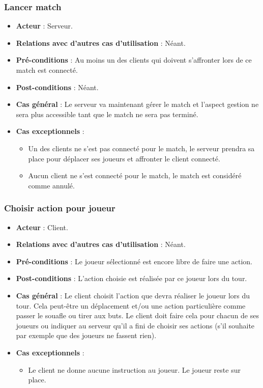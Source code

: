 \documentclass[a4paper,titlepage]{scrreprt}
\begin{document}
    \subsubsection{Lancer match}
      \begin{itemize}
        \item \textbf{Acteur}  : Serveur.
        \item \textbf{Relations avec d'autres cas d'utilisation}  : Néant.
        \item \textbf{Pré-conditions} : Au moins un des clients qui doivent s’affronter lors de ce match est connecté.
        \item \textbf{Post-conditions} : Néant.
        \item \textbf{Cas général} : Le serveur va maintenant gérer le match et l’aspect gestion ne sera plus accessible tant que le match ne sera pas terminé.
        \item \textbf{Cas exceptionnels} : 
          \begin{itemize}
            \item Un des clients ne s’est pas connecté pour le match, le serveur prendra sa place pour déplacer ses joueurs et affronter le client connecté.
			\item Aucun client ne s’est connecté pour le match, le match est considéré comme annulé.
          \end{itemize}    	
      \end{itemize}
    \subsubsection{Choisir action pour joueur}
      \begin{itemize}
        \item \textbf{Acteur}  : Client.
        \item \textbf{Relations avec d'autres cas d'utilisation}  : Néant.
        \item \textbf{Pré-conditions} : Le joueur sélectionné est encore libre de faire une action.
        \item \textbf{Post-conditions} : L'action choisie est réalisée par ce joueur lors du tour.
        \item \textbf{Cas général} : Le client choisit l'action que devra réaliser le joueur lors du tour. Cela peut-être un déplacement et/ou une action particulière comme passer le souafle ou tirer aux buts. Le client doit faire cela pour chacun de ses joueurs ou indiquer au serveur qu’il a fini de choisir ses actions (s’il souhaite par exemple que des joueurs ne fassent rien).
        \item \textbf{Cas exceptionnels} : 
        \begin{itemize}
         \item Le client ne donne aucune instruction au joueur. Le joueur reste sur place.
        \end{itemize}
      \end{itemize}
\end{document}
